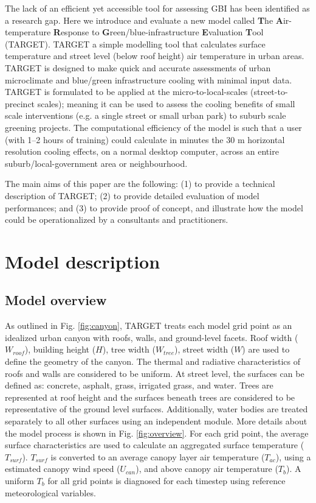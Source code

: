 \documentclass[gmd, manuscript]{copernicus}
\begin{document}
The lack of an efficient yet accessible tool for assessing GBI has been identified as a research gap. Here we introduce and evaluate a new model called \textbf{T}he \textbf{A}ir-temperature \textbf{R}esponse to \textbf{G}reen/blue-infrastructure \textbf{E}valuation \textbf{T}ool (TARGET). TARGET a simple modelling tool that calculates surface temperature and street level (below roof height) air temperature in urban areas. TARGET is designed to make quick and accurate assessments of urban microclimate and blue/green infrastructure cooling with minimal input data. TARGET is formulated to be applied at the micro-to-local-scales (street-to-precinct scales); meaning it can be used to assess the cooling benefits of small scale interventions (e.g. a single street or small urban park) to suburb scale greening projects. The computational efficiency of the model is such that a user (with 1--2 hours of training) could calculate in minutes the 30 m horizontal resolution  cooling effects, on a normal desktop computer, across an entire suburb/local-government area or neighbourhood. 

The main aims of this paper are the following: (1) to provide a technical description of TARGET; (2) to provide detailed evaluation of model performances; and (3) to provide proof of concept, and illustrate how the model could be operationalized  by a consultants and practitioners.



\section{Model description}\label{sec:ModelOverview}
\subsection{Model overview}

As outlined in Fig. \ref{fig:canyon}, TARGET treats each model grid point as an idealized urban canyon with roofs, walls, and  ground-level facets.   Roof width ($W_{roof}$), building  height ($H$), tree width ($W_{tree}$),  street width ($W$)  are used to define the geometry of the canyon. The thermal and radiative characteristics of roofs and walls are considered to be uniform. At street level, the surfaces  can be defined as: concrete, asphalt, grass, irrigated grass, and water. Trees are represented at roof height and the surfaces beneath trees are considered to be representative of the ground level surfaces. Additionally, water bodies are treated separately to all other surfaces using an independent  module. More details about the model process is shown in Fig. \ref{fig:overview}. For each grid point, the average surface characteristics are used to calculate an aggregated surface temperature ($T_{surf}$). $T_{surf}$ is converted to an average canopy layer air temperature ($T_{ac}$), using a estimated canopy wind speed ($U_{can}$), and above canopy air temperature (\ensuremath{T_{b}}).  A uniform \ensuremath{T_{b}} for all grid points is diagnosed for each timestep using reference meteorological variables. 
\end{document}
